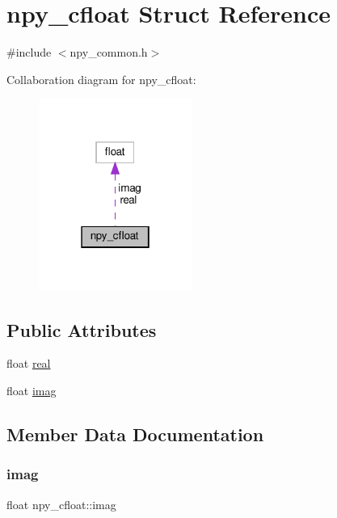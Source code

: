 \hypertarget{structnpy__cfloat}{}\section{npy\+\_\+cfloat Struct Reference}
\label{structnpy__cfloat}


{\ttfamily \#include $<$npy\+\_\+common.\+h$>$}



Collaboration diagram for npy\+\_\+cfloat\+:
\nopagebreak
\begin{figure}[H]
\begin{center}
\leavevmode
\includegraphics[width=142pt]{structnpy__cfloat__coll__graph}
\end{center}
\end{figure}
\subsection*{Public Attributes}
\begin{DoxyCompactItemize}
\item 
float \hyperlink{structnpy__cfloat_a363207c3f19ae8b58dedc9fcb350b0c9}{real}
\item 
float \hyperlink{structnpy__cfloat_abbc4ae5df64e7058b3c0185c00b8d455}{imag}
\end{DoxyCompactItemize}


\subsection{Member Data Documentation}
\mbox{\label{structnpy__cfloat_abbc4ae5df64e7058b3c0185c00b8d455}} 
\subsubsection{\texorpdfstring{imag}{imag}}
{\footnotesize\ttfamily float npy\+\_\+cfloat\+::imag}


